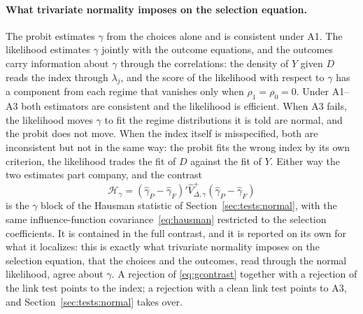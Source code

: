 \documentclass[11pt,a4paper]{article}
\theoremstyle{plain}
\theoremstyle{definition}
\theoremstyle{remark}
\newcommand{\1}{\mathbf{1}}
\begin{document}
\paragraph{What trivariate normality imposes on the selection equation.}
The probit estimates $\gamma$ from the choices alone and is consistent
under A1. The likelihood estimates $\gamma$ jointly with the outcome
equations, and the outcomes carry information about $\gamma$ through the
correlations: the density of $Y$ given $D$ reads the index through
$\lambda_j$, and the score of the likelihood with respect to $\gamma$ has
a component from each regime that vanishes only when $\rho_1=\rho_0=0$.
Under A1--A3 both estimators are consistent and the likelihood is
efficient. When A3 fails, the likelihood moves $\gamma$ to fit the
regime distributions it is told are normal, and the probit does not
move. When the index itself is misspecified, both are inconsistent but
not in the same way: the probit fits the wrong index by its own
criterion, the likelihood trades the fit of $D$ against the fit of $Y$.
Either way the two estimates part company, and the contrast
\begin{equation}\label{eq:gcontrast}
\mathcal{H}_\gamma=(\hat\gamma_{P}-\hat\gamma_{F})'\hat V_{\Delta,\gamma}^{+}(\hat\gamma_{P}-\hat\gamma_{F})
\end{equation}
is the $\gamma$ block of the Hausman statistic of
Section~\ref{sec:tests:normal}, with the same influence-function
covariance~\eqref{eq:hausman} restricted to the selection coefficients.
It is contained in the full contrast, and it is reported on its own for
what it localizes: this is exactly what trivariate normality imposes on
the selection equation, that the choices and the outcomes, read through
the normal likelihood, agree about $\gamma$. A rejection of
\eqref{eq:gcontrast} together with a rejection of the link test points to
the index; a rejection with a clean link test points to A3, and
Section~\ref{sec:tests:normal} takes over.
\end{document}
